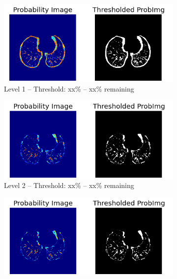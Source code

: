 \begin{figure}[p] %
\begin{center}
	\begin{subfigure}[b]{\linewidth}
		\includegraphics[width=\linewidth]{img/cascades/D50L1S50.png}
		\caption{Level 1 -- Threshold: xx\% -- xx\% remaining}
	\end{subfigure}
	\begin{subfigure}[b]{\linewidth}
		\includegraphics[width=\linewidth]{img/cascades/D50L2S50.png}
		\caption{Level 2 -- Threshold: xx\% -- xx\% remaining}
	\end{subfigure}
	\begin{subfigure}[b]{\linewidth}
		\includegraphics[width=\linewidth]{img/cascades/D50L3S50.png}

\end{subfigure}
\end{center}
\end{figure}
